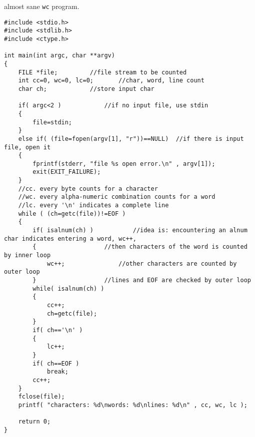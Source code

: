 \begin{question}
  almost sane \verb|wc| program.
\end{question}
\begin{solution}
  \begin{verbatim}
#include <stdio.h>
#include <stdlib.h>
#include <ctype.h>

int main(int argc, char **argv)
{
	FILE *file;			//file stream to be counted
	int cc=0, wc=0, lc=0;		//char, word, line count
	char ch;			//store input char
	
	if( argc<2 )			//if no input file, use stdin
	{
		file=stdin;
	}
	else if( (file=fopen(argv[1], "r"))==NULL)	//if there is input file, open it
	{
		fprintf(stderr, "file %s open error.\n" , argv[1]);
		exit(EXIT_FAILURE);
	}
	//cc. every byte counts for a character
	//wc. every alpha-numeric combination counts for a word
	//lc. every '\n' indicates a complete line
	while ( (ch=getc(file))!=EOF )
	{
		if( isalnum(ch) )			//idea is: encountering an alnum char indicates entering a word, wc++,
		{					//then characters of the word is counted by inner loop
			wc++;				//other characters are counted by outer loop
		}					//lines and EOF are checked by outer loop
		while( isalnum(ch) )
		{
			cc++;
			ch=getc(file);
		}
		if( ch=='\n' )
		{
			lc++;
		}
		if( ch==EOF )
			break;
		cc++;
	}
	fclose(file);
	printf( "characters: %d\nwords: %d\nlines: %d\n" , cc, wc, lc );

	return 0;
}
  \end{verbatim}
\end{solution}

